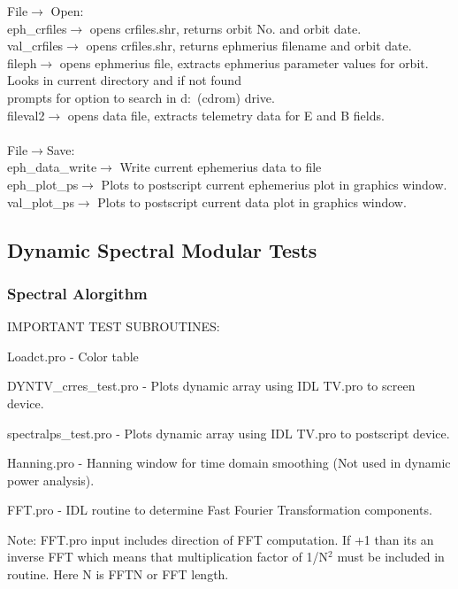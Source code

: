 					File$\rightarrow$ Open:\\
					eph\_crfiles$\rightarrow$ opens crfiles.shr, returns orbit No. and orbit date.\\
					val\_crfiles$\rightarrow$ opens crfiles.shr, returns ephmerius filename and orbit date.\\
					fileph$\rightarrow$ opens ephmerius file, extracts ephmerius parameter values for orbit.\\
							Looks in current directory and if not found\\
							prompts for option to search in d:\ (cdrom) drive.\\
					fileval2$\rightarrow$ opens data file, extracts telemetry data for E and B fields.\\

\\
					File$\rightarrow$Save:\\
					eph\_data\_write$\rightarrow$ Write current ephemerius data to file\\
					eph\_plot\_ps$\rightarrow$ Plots to postscript current ephemerius plot in graphics window.\\
					val\_plot\_ps$\rightarrow$ Plots to postscript current data plot in graphics window.\\



\subsection{Dynamic Spectral Modular Tests}
\subsubsection{Spectral Alorgithm}

IMPORTANT TEST SUBROUTINES: 

Loadct.pro - Color table

DYNTV_crres_test.pro - Plots dynamic array using IDL TV.pro to screen device.

spectralps_test.pro - Plots  dynamic array using IDL TV.pro to postscript device.

Hanning.pro - Hanning window for time domain smoothing (Not used in dynamic power analysis). 

FFT.pro - IDL routine to determine Fast Fourier Transformation components.

Note: FFT.pro input includes direction of FFT computation. If +1 than its an inverse FFT which means that multiplication factor of 1/N$^2$ must be included in routine. Here N is FFTN or FFT length.
  
